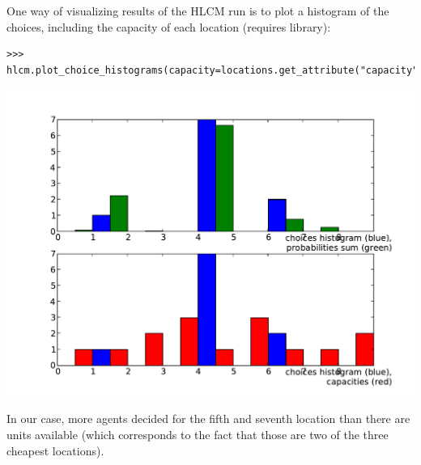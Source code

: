 One way of visualizing results of the HLCM run is to plot a histogram \histogramindex of the
choices, including the capacity of each location (requires 
library):
\histogramindex
\begin{verbatim}
>>> hlcm.plot_choice_histograms(capacity=locations.get_attribute("capacity"))
\end{verbatim}
\begin{center}
\includegraphics[scale=0.5, angle=0]{images/hlcmhist.pdf}
\end{center}
In our case, more agents decided for the fifth and seventh location than there
are units available (which corresponds to the fact that those are two of the three cheapest locations).

